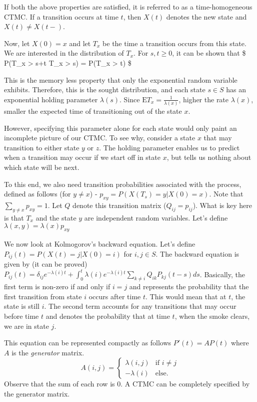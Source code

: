 \documentclass[article,nojss]{jss}
\begin{document}
If both the above properties are satisfied, it is referred to as a time-homogeneous CTMC. If a transition occurs at time \(t\), then \(X(t)\) denotes the new state and \(X(t)\neq X(t-)\).

Now, let \(X(0)=x\) and let \(T_x\) be the time a transition occurs from this state. We are interested in the distribution of \(T_x\). For \(s,t \geq 0\), it can be shown that \$ P(T\_x \textgreater{} s+t \textbar{} T\_x \textgreater{} s) = P(T\_x \textgreater{} t) \$

This is the memory less property that only the exponential random variable exhibits. Therefore, this is the sought distribution, and each state \(s \in S\) has an exponential holding parameter \(\lambda(s)\). Since \(\mathrm{E}T_x = \frac{1}{\lambda(x)}\), higher the rate \(\lambda(x)\), smaller the expected time of transitioning out of the state \(x\).

However, specifying this parameter alone for each state would only paint an incomplete picture of our CTMC. To see why, consider a state \(x\) that may transition to either state \(y\) or \(z\). The holding parameter enables us to predict when a transition may occur if we start off in state \(x\), but tells us nothing about which state will be next.

To this end, we also need transition probabilities associated with the process, defined as follows (for \(y \neq x\)) - \(p_{xy} = P(X(T_s) = y | X(0) = x)\). Note that \(\sum_{y \neq x} p_{xy} = 1\). Let \(Q\) denote this transition matrix (\(Q_{ij} = p_{ij}\)). What is key here is that \(T_x\) and the state \(y\) are independent random variables. Let's define \(\lambda(x, y) = \lambda(x) p_{xy}\)

We now look at Kolmogorov's backward equation. Let's define \(P_{ij}(t) = P(X(t) = j | X(0) = i)\) for \(i, j \in S\). The backward equation is given by (it can be proved) \(P_{ij}(t) = \delta_{ij}e^{-\lambda(i)t} + \int_{0}^{t}\lambda(i)e^{-\lambda(i)t} \sum_{k \neq i} Q_{ik} P_{kj}(t-s) ds\). Basically, the first term is non-zero if and only if \(i=j\) and represents the probability that the first transition from state \(i\) occurs after time \(t\). This would mean that at \(t\), the state is still \(i\). The second term accounts for any transitions that may occur before time \(t\) and denotes the probability that at time \(t\), when the smoke clears, we are in state \(j\).

This equation can be represented compactly as follows \(P'(t) = AP(t)\) where \(A\) is the \emph{generator} matrix.
\[
A(i, j) = \begin{cases} \lambda(i, j) & \mbox{if } i \neq j \\ -\lambda(i) & \mbox{else.} \end{cases}
\]
Observe that the sum of each row is 0. A CTMC can be completely specified by the generator matrix.
\end{document}
